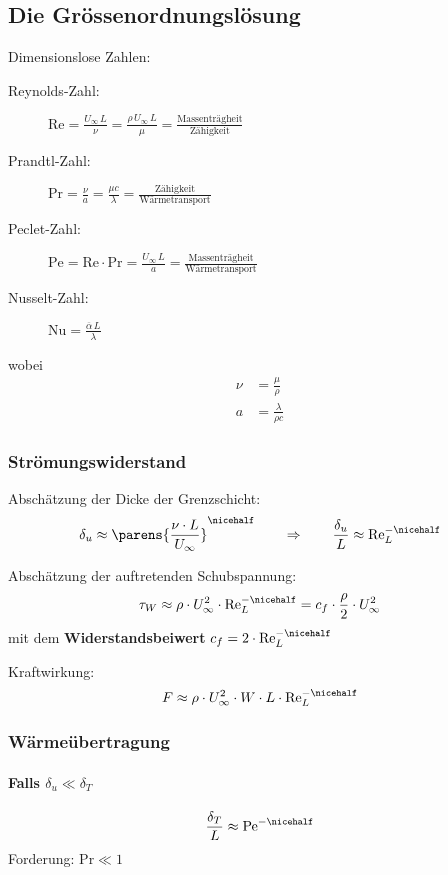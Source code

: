 	\subsection{Die Grössenordnungslösung} %
		Dimensionslose Zahlen:
		\begin{description}
			\item[Reynolds-Zahl:] $\mathrm{Re} = \frac{U_\infty \, L}{\nu} = \frac{\rho\, U_\infty \, L}{\mu} = \frac{\text{Massenträgheit}}{\text{Zähigkeit}}$
			\item[Prandtl-Zahl:] $\mathrm{Pr} = \frac{\nu}{a} = \frac{\mu c}{\lambda}
				= \frac{\text{Zähigkeit}}{\text{Wärmetransport}}$
			\item[Peclet-Zahl:] $\mathrm{Pe} = \mathrm{Re} \cdot \mathrm{Pr} = \frac{U_\infty \, L}{a} = \frac{\text{Massenträgheit}}{\text{Wärmetransport}}$
			\item[Nusselt-Zahl:] $\mathrm{Nu} = \frac{\overline\alpha \, L}{\lambda}$
		\end{description}
		wobei
		\begin{align*}
			\nu &= \frac{\mu}{\rho} \\
			a &= \frac{\lambda}{\rho c}
		\end{align*}

		\subsubsection{Strömungswiderstand} %
			Abschätzung der Dicke der Grenzschicht:
			\[
				\delta_u \approx \parens{
					\frac{\nu \cdot L}{U_\infty}
				}^{\nicehalf}
				\qquad \Rightarrow \qquad
				\frac {\delta_u} L \approx \mathrm{Re}_L^{-\nicehalf}
			\]

			Abschätzung der auftretenden Schubspannung:
			\[
				\tau_W \approx \rho \cdot U_\infty^2 \cdot \mathrm{Re}_L^{-\nicehalf} = c_f \cdot \frac \rho 2 \cdot U_\infty^2
			\]
			mit dem \textbf{Widerstandsbeiwert}
			$
				c_f = 2 \cdot \mathrm{Re}_L^{-\nicehalf}
			$

			Kraftwirkung:
			\[
				F \approx \rho \cdot U_\infty^2 \cdot W \cdot L \cdot \mathrm{Re}_L^{- \nicehalf}
			\]

		\subsubsection{Wärmeübertragung} %
			\paragraph{Falls $\delta_u \ll \delta_T$} %
				\[
					\frac{\delta_T}{L} \approx \mathrm{Pe}^{- \nicehalf}
				\]
				Forderung: $\mathrm{Pr} \ll 1$

